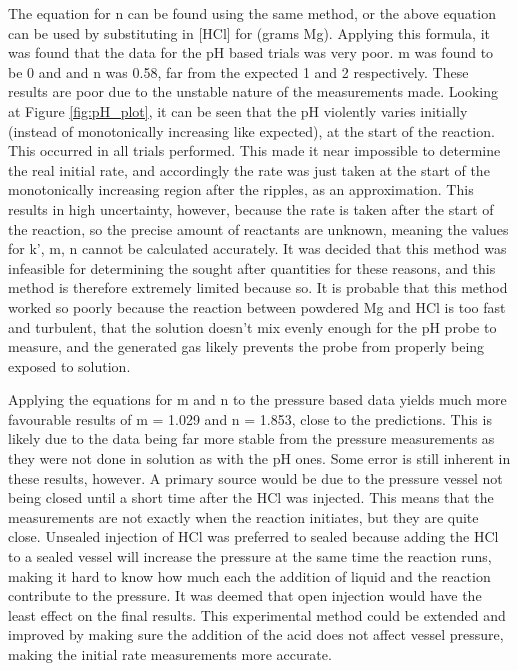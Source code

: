 \documentclass[12pt, letterpaper]{article}
\begin{document}
The equation for n can be found using the same method, or the above equation can be used by substituting in [HCl] for (grams Mg). Applying this formula, it was found that the data for the pH based trials was very poor. m was found to be 0 and and n was 0.58, far from the expected 1 and 2 respectively. These results are poor due to the unstable nature of the measurements made. Looking at Figure \ref{fig:pH_plot}, it can be seen that the pH violently varies initially (instead of monotonically increasing like expected), at the start of the reaction. This occurred in all trials performed. This made it near impossible to determine the real initial rate, and accordingly the rate was just taken at the start of the monotonically increasing region after the ripples, as an approximation. This results in high uncertainty, however, because the rate is taken after the start of the reaction, so the precise amount of reactants are unknown, meaning the values for k', m, n cannot be calculated accurately. It was decided that this method was infeasible for determining the sought after quantities for these reasons, and this method is therefore extremely limited because so. It is probable that this method worked so poorly because the reaction between powdered Mg and HCl is too fast and turbulent, that the solution doesn't mix evenly enough for the pH probe to measure, and the generated gas likely prevents the probe from properly being exposed to solution.\\\par
Applying the equations for m and n to the pressure based data yields much more favourable results of m = 1.029 and n = 1.853, close to the predictions. This is likely due to the data being far more stable from the pressure measurements as they were not done in solution as with the pH ones. Some error is still inherent in these results, however. A primary source would be due to the pressure vessel not being closed until a short time after the HCl was injected. This means that the measurements are not exactly when the reaction initiates, but they are quite close. Unsealed injection of HCl was preferred to sealed because adding the HCl to a sealed vessel will increase the pressure at the same time the reaction runs, making it hard to know how much each the addition of liquid and the reaction contribute to the pressure. It was deemed that open injection would have the least effect on the final results. This experimental method could be extended and improved by making sure the addition of the acid does not affect vessel pressure, making the initial rate measurements more accurate.\\\par 
\end{document}
